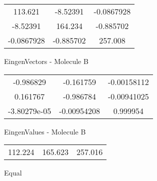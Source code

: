 \begin{multicols}{2}
\begin{center}
\begin{tabular}{|c c c|}
113.621	 & 	-8.52391	 & 	-0.0867928	 \\
-8.52391	 & 	164.234	 & 	-0.885702	 \\
-0.0867928	 & 	-0.885702	 & 	257.008
\end{tabular}

\vtab
 EingenVectors - Molecule B     \\
\vtab
\begin{tabular}{|c c c|}
-0.986829	 & 	-0.161759	 & 	-0.00158112	 \\
0.161767	 & 	-0.986784	 & 	-0.00941025	 \\
-3.80279e-05	 & 	-0.00954208	 & 	0.999954
\end{tabular}

\vtab
 EingenValues - Molecule B     \\
\vtab
\begin{tabular}{|c c c|}
112.224	 & 	165.623	 & 	257.016	 \\
\end{tabular}

\end{center}
\end{multicols}
\begin{center}
\vtab
\vtab
\textcolor{NavyBlue}{\Large Equal}
\end{center}

 \newpage

